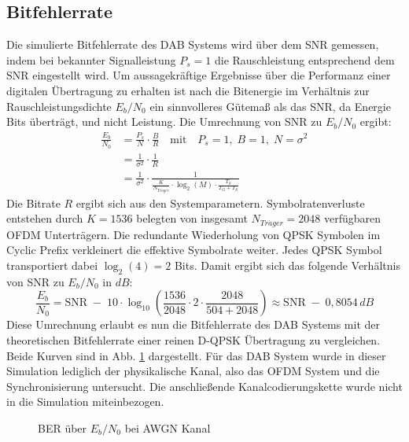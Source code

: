 \subsection{Bitfehlerrate}
Die simulierte Bitfehlerrate des DAB Systems wird über dem SNR gemessen, indem bei bekannter Signalleistung $P_s = 1$ die Rauschleistung entsprechend dem SNR eingestellt wird. Um aussagekräftige Ergebnisse über die Performanz einer digitalen Übertragung zu erhalten ist nach \cite{snr:sklar2001digital} die Bitenergie im Verhältnis zur Rauschleistungsdichte $E_b/N_0$ ein sinnvolleres Gütemaß als das SNR, da Energie Bits überträgt, und nicht Leistung.
Die Umrechnung von SNR zu $E_b/N_0$ ergibt:
\begin{equation}
\begin{aligned}
\frac{E_b}{N_0} &= \frac{P_s}{N} \cdot \frac{B}{R} \quad \text{mit} \quad P_s=1,\; B=1,\; N=\sigma^2 \\
&= \frac{1}{\sigma^2} \cdot \frac{1}{R} \\
&= \frac{1}{\sigma^2} \cdot \frac{1}{\frac{K}{N_{Tr\ddot{a}ger}} \cdot \log_2 (M) \cdot \frac{T_S}{T_G+T_S}}
\end{aligned}
\end{equation}
Die Bitrate $R$ ergibt sich aus den Systemparametern. Symbolratenverluste entstehen durch $K=1536$ belegten von insgesamt $N_{Tr\ddot{a}ger}=2048$ verfügbaren OFDM Unterträgern. Die redundante Wiederholung von QPSK Symbolen im Cyclic Prefix verkleinert die effektive Symbolrate weiter. Jedes QPSK Symbol transportiert dabei $\log_2 (4) = 2$ Bits. Damit ergibt sich das folgende Verhältnis von SNR zu $E_b/N_0$ in $dB$:
\begin{equation}
\frac{E_b}{N_0} = \text{SNR} \; - \; 10\cdot \log_{10} \left(\frac{1536}{2048} \cdot 2 \cdot \frac{2048}{504+2048} \right) \approx \text{SNR} \; - \; 0,8054\, dB
\end{equation}
Diese Umrechnung erlaubt es nun die Bitfehlerrate des DAB Systems mit der theoretischen Bitfehlerrate einer reinen D-QPSK Übertragung zu vergleichen. Beide Kurven sind in Abb. \ref{plot:awgn_ber} dargestellt. Für das DAB System wurde in dieser Simulation lediglich der physikalische Kanal, also das OFDM System und die Synchronisierung untersucht. Die anschließende Kanalcodierungskette wurde nicht in die Simulation miteinbezogen. 

\begin{figure}[htb]
\begin{center}
\end{center}
\caption{BER über $E_b/N_0$ bei AWGN Kanal}
\label{plot:awgn_ber}
\end{figure}

